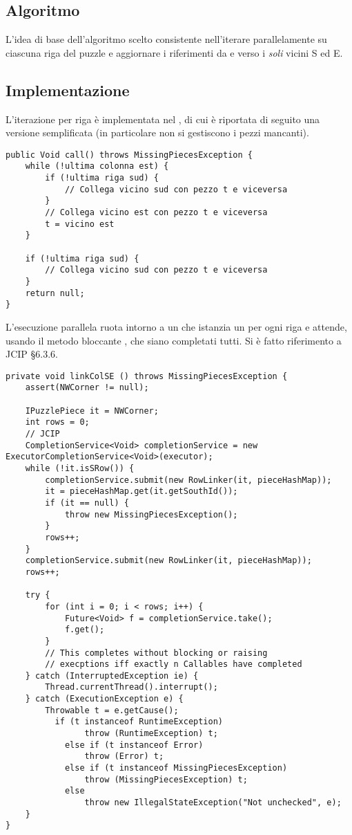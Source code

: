 \documentclass[a4paper]{article}
\begin{document}
\subsection{Algoritmo}
L'idea di base dell'algoritmo scelto consistente nell'iterare parallelamente su ciascuna riga del puzzle e aggiornare i riferimenti da e verso i \emph{soli} vicini S ed E.
\subsection{Implementazione}
L'iterazione per riga \`e implementata nel  , di cui \`e riportata di seguito una versione semplificata (in particolare non si gestiscono i pezzi mancanti).

\begin{verbatim}
public Void call() throws MissingPiecesException {
	while (!ultima colonna est) {
		if (!ultima riga sud) {
			// Collega vicino sud con pezzo t e viceversa                      
		}
		// Collega vicino est con pezzo t e viceversa
		t = vicino est
	}

	if (!ultima riga sud) {
		// Collega vicino sud con pezzo t e viceversa
	}	
	return null;
}
\end{verbatim}

L'esecuzione parallela ruota intorno a un  che istanzia un  per ogni riga e attende, usando il metodo bloccante , che siano completati tutti.
Si \`e fatto riferimento a JCIP §6.3.6.

\begin{verbatim}
private void linkColSE () throws MissingPiecesException {
	assert(NWCorner != null);
	
	IPuzzlePiece it = NWCorner;
	int rows = 0;
	// JCIP
	CompletionService<Void> completionService = new ExecutorCompletionService<Void>(executor);
	while (!it.isSRow()) {
		completionService.submit(new RowLinker(it, pieceHashMap));
		it = pieceHashMap.get(it.getSouthId());
		if (it == null) {
			throw new MissingPiecesException();
		}
		rows++;
	}
	completionService.submit(new RowLinker(it, pieceHashMap));
	rows++;

	try {
		for (int i = 0; i < rows; i++) {
			Future<Void> f = completionService.take();
			f.get();
		}
		// This completes without blocking or raising
		// execptions iff exactly n Callables have completed
	} catch (InterruptedException ie) {
		Thread.currentThread().interrupt();
	} catch (ExecutionException e) {
		Throwable t = e.getCause();
		  if (t instanceof RuntimeException) 
	            throw (RuntimeException) t;
	        else if (t instanceof Error)
	            throw (Error) t;
	        else if (t instanceof MissingPiecesException)
	        	throw (MissingPiecesException) t;
	        else
	            throw new IllegalStateException("Not unchecked", e);
	}
}

\end{verbatim}
\end{document}
